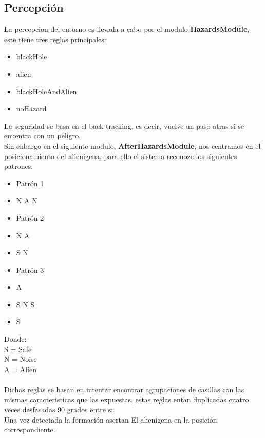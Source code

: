 \documentclass[a4paper,10pt]{article}
\begin{document}
\subsection{Percepción}
La percepcion del entorno es llevada a cabo por el modulo {\bf HazardsModule}, este tiene tres reglas principales:
\begin{itemize}
	\item blackHole
	\item alien
	\item blackHoleAndAlien
	\item noHazard
\end{itemize}
La seguridad se basa en el back-tracking, es decir, vuelve un paso atras si se enuentra con un peligro.
\hspace{0.5 cm}\\
Sin enbargo en el siguiente modulo, {\bf AfterHazardsModule}, nos centramos en el posicionamiento del alienigena, para ello el sistema reconoze los siguientes patrones:
\begin{itemize}
	\item Patrón 1
	\item [] N A N
	\item Patrón 2
	\item [] N A
	\item [] S N
	\item Patrón 3
	\item [] \hspace{0.3 cm}A
	\item [] S N S
	\item [] \hspace{0.3 cm}S
\end{itemize}
Donde: \\
S = Safe\\
N = Noise\\
A = Alien\\
\vspace{0.5 cm}\\
Dichas reglas se basan en intentar encontrar agrupaciones de casillas con las mismas caracteristicas que las expuestas, estas reglas entan duplicadas cuatro veces desfasadas 90 grados entre si.
\vspace{0.2 cm}\\
Una vez detectada la formación asertan El alienigena en la posición correspondiente.\\
\end{document}
